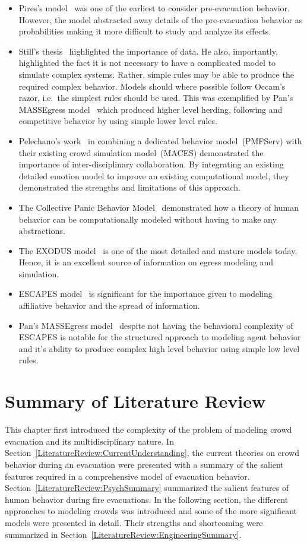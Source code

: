 \begin{itemize}
	\item Pires's model~\cite{Pires:2005gs} was one of the earliest to consider pre-evacuation behavior. However, the model abstracted away details of the pre-evacuation behavior as probabilities making it more difficult to study and analyze its effects.
	\item Still's thesis~\cite{Still:2000tp} highlighted the importance of data. He also, importantly, highlighted the fact it is not necessary to have a complicated model to simulate complex systems. Rather, simple rules may be able to produce the required complex behavior. Models should where possible follow Occam's razor, i.e.\ the simplest rules should be used. This was exemplified by Pan's MASSEgress model~\cite{Pan:2007gb} which produced higher level herding, following and competitive behavior by using simple lower level rules.
	\item Pelechano's work~\cite{Pelechano:2005vp} in combining a dedicated behavior model~(PMFServ) with their existing crowd simulation model~(MACES) demonstrated the importance of inter-disciplinary collaboration. By integrating an existing detailed emotion model to improve an existing computational model, they demonstrated the strengths and limitations of this approach.
	\item The Collective Panic Behavior Model~\cite{Franca:2009wq} demonstrated how a theory of human behavior can be computationally modeled without having to make any abstractions.
	\item The EXODUS model~\cite{Owen:1996jh} is one of the most detailed and mature models today. Hence, it is an excellent source of information on egress modeling and simulation.
    \item ESCAPES model~\cite{Tsai:2011tz} is significant for the importance given to modeling affiliative behavior and the spread of information.
	\item Pan's MASSEgress model~\cite{Pan:2006vp} despite not having the behavioral complexity of ESCAPES is notable for the structured approach to modeling agent behavior and it's ability to produce complex high level behavior using simple low level rules.
\end{itemize}

\section{Summary of Literature Review}
\label{LiteratureReview:Summary}
This chapter first introduced the complexity of the problem of modeling crowd evacuation and its multidisciplinary nature. In Section~\ref{LiteratureReview:CurrentUnderstanding}, the current theories on crowd behavior during an evacuation were presented with a summary of the salient features required in a comprehensive model of evacuation behavior. Section~\ref{LiteratureReview:PsychSummary} summarized the salient features of human behavior during fire evacuations. In the following section, the different approaches to modeling crowds was introduced and some of the more significant models were presented in detail. Their strengths and shortcoming were summarized in Section~\ref{LiteratureReview:EngineeringSummary}.

